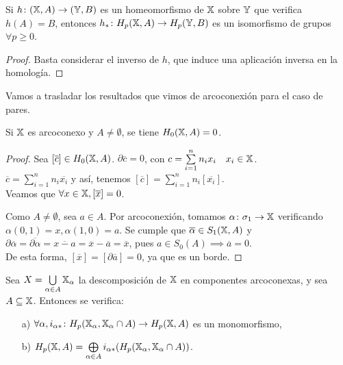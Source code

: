 \begin{corollary}
  Si $h \colon ({\mathbb X}, A) \to ({\mathbb Y}, B)$ es un homeomorfismo de ${\mathbb X}$ sobre ${\mathbb Y}$ que verifica $h(A) = B$, entonces
  $h_* \colon H_p({\mathbb X}, A) \to H_p({\mathbb Y}, B)$ es un isomorfismo de grupos $\forall p \geq 0$.
\end{corollary}

\begin{proof}
  Basta considerar el inverso de $h$, que induce una aplicación inversa en la homología.
\end{proof}

Vamos a trasladar los resultados que vimos de arcoconexión para el caso de pares.

\begin{proposition}\label{prop1-17}
  Si ${\mathbb X}$ es arcoconexo y $A \neq \emptyset$, se tiene $H_0({\mathbb X}, A) = 0$.
\end{proposition}

\begin{proof}
  Sea $[\overline{c}] \in H_0({\mathbb X}, A)$. $\partial\overline{c} = 0$, con $c = \sum\limits_{i = 1}^n n_i x_i \quad x_i \in {\mathbb X}$. \\
  $\overline{c} = \sum\limits_{i = 1}^n n_i \overline{x_i}$ y así, tenemos $[\overline{c}] = \sum\limits_{i = 1}^n n_i [\overline{x_i}]$. \\
  Veamos que $\forall x \in {\mathbb X}, [\overline{x}] = 0$.

  Como $A \neq \emptyset$, sea $a \in A$. Por arcoconexión, tomamos $\alpha \colon \sigma_1 \to {\mathbb X}$ verificando $\alpha(0, 1) = x, \alpha(1, 0) = a$.
  Se cumple que $\overline{\alpha} \in S_1({\mathbb X}, A)$ y $\partial\overline{\alpha} = \overline{\partial\alpha} = \overline{x - a} = \overline{x} - \overline{a}
  = \overline{x}$, pues $a \in S_0(A) \implies \overline{a} = 0$. \\
  De esta forma, $[\overline{x}] = [\partial\overline{a}] = 0$, ya que es un borde.
\end{proof}

\begin{proposition}
  Sea $X = \bigcup\limits_{\alpha \in A} {\mathbb X}_\alpha$ la descomposición de ${\mathbb X}$ en componentes arcoconexas, y sea $A \subseteq {\mathbb X}$. Entonces se verifica:
  \begin{itemize}
    \item[a)] $\forall \alpha, i_{\alpha *} \colon H_p({\mathbb X}_\alpha, {\mathbb X}_\alpha \cap A) \to H_p({\mathbb X}, A)$ es un monomorfismo,
    \item[b)] $H_p({\mathbb X}, A) = \bigoplus\limits_{\alpha \in A}  i_{\alpha *}(H_p({\mathbb X}_\alpha, {\mathbb X}_\alpha \cap A))$.
  \end{itemize}
\end{proposition}

